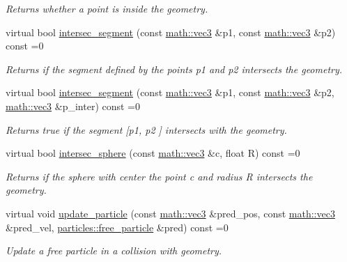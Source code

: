 \begin{DoxyCompactItemize}
\begin{DoxyCompactList}\small\item\em Returns whether a point is inside the geometry. \end{DoxyCompactList}\item 
virtual bool \hyperlink{classphysim_1_1geometric_1_1geometry_a63d63c340937cede50a95903679c5ad3}{intersec\+\_\+segment} (const \hyperlink{structphysim_1_1math_1_1vec3}{math\+::vec3} \&p1, const \hyperlink{structphysim_1_1math_1_1vec3}{math\+::vec3} \&p2) const =0
\begin{DoxyCompactList}\small\item\em Returns if the segment defined by the points {\itshape p1} and {\itshape p2} intersects the geometry. \end{DoxyCompactList}\item 
virtual bool \hyperlink{classphysim_1_1geometric_1_1geometry_ae9fa877e89b7b2693a94d0772561ad9a}{intersec\+\_\+segment} (const \hyperlink{structphysim_1_1math_1_1vec3}{math\+::vec3} \&p1, const \hyperlink{structphysim_1_1math_1_1vec3}{math\+::vec3} \&p2, \hyperlink{structphysim_1_1math_1_1vec3}{math\+::vec3} \&p\+\_\+inter) const =0
\begin{DoxyCompactList}\small\item\em Returns true if the segment \mbox{[}{\itshape p1}, {\itshape p2} \mbox{]} intersects with the geometry. \end{DoxyCompactList}\item 
virtual bool \hyperlink{classphysim_1_1geometric_1_1geometry_aab49e452a72d1ecaf434be2b8de98169}{intersec\+\_\+sphere} (const \hyperlink{structphysim_1_1math_1_1vec3}{math\+::vec3} \&c, float R) const =0
\begin{DoxyCompactList}\small\item\em Returns if the sphere with center the point {\itshape c} and radius {\itshape R} intersects the geometry. \end{DoxyCompactList}\item 
virtual void \hyperlink{classphysim_1_1geometric_1_1geometry_ae5d606ba51451b964fcb2301d5622cab}{update\+\_\+particle} (const \hyperlink{structphysim_1_1math_1_1vec3}{math\+::vec3} \&pred\+\_\+pos, const \hyperlink{structphysim_1_1math_1_1vec3}{math\+::vec3} \&pred\+\_\+vel, \hyperlink{classphysim_1_1particles_1_1free__particle}{particles\+::free\+\_\+particle} \&pred) const =0
\begin{DoxyCompactList}\small\item\em Update a free particle in a collision with geometry. \end{DoxyCompactList}\item 

\end{DoxyCompactItemize}
